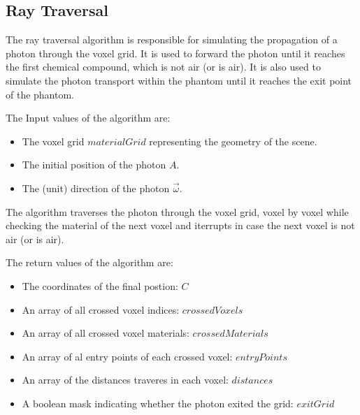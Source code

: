 \subsection{Ray Traversal}
\label{sec:rayTraversal}

The ray traversal algorithm is responsible for simulating the propagation of a
photon through the voxel grid. It is used to forward the photon until it reaches
the first chemical compound, which is not air (or is air). It is also
used to simulate the photon transport within the phantom until it reaches the
exit point of the phantom.

The Input values of the algorithm are:
\begin{itemize}
    \item The voxel grid $materialGrid$ representing the geometry of the scene.
    \item The initial position of the photon $A$.
    \item The (unit) direction of the photon $\vec{\omega}$.
\end{itemize}

The algorithm traverses the photon through the voxel grid, voxel by voxel while checking the material of the next voxel and iterrupts in case the next voxel is not air (or is air).

The return values of the algorithm are:
\begin{itemize}
    \item The coordinates of the final postion: $C$
    \item An array of all crossed voxel indices: $crossedVoxels$
    \item An array of all crossed voxel materials: $crossedMaterials$
    \item An array of al entry points of each crossed voxel: $entryPoints$
    \item An array of the distances traveres in each voxel: $distances$
    \item A boolean mask indicating whether the photon exited the grid:
    $exitGrid$
\end{itemize}

